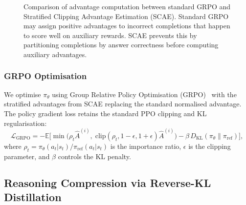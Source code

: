 \begin{figure}[t]
    \centering
    \caption{Comparison of advantage computation between standard GRPO
    and Stratified Clipping Advantage Estimation (SCAE). Standard GRPO
    may assign positive advantages to incorrect completions that happen
    to score well on auxiliary rewards. SCAE prevents this by
    partitioning completions by answer correctness before computing
    auxiliary advantages.}
    \label{fig:scae}
\end{figure}

\subsubsection{GRPO Optimisation}

We optimise $\pi_\theta$ using Group Relative Policy Optimisation
(GRPO)~\citep{shao2024deepseekmath} with the stratified advantages from
SCAE replacing the standard normalised advantage. The policy gradient loss
retains the standard PPO clipping and KL regularisation:
\begin{equation}
\label{eq:grpo_loss}
\mathcal{L}_{\mathrm{GRPO}} = -\mathbb{E}\bigg[
    \min\!\Big(\rho_t \hat{A}^{(i)},\;
    \mathrm{clip}(\rho_t, 1\!-\!\epsilon, 1\!+\!\epsilon)\hat{A}^{(i)}
    \Big) - \beta\, D_{\mathrm{KL}}(\pi_\theta \| \pi_{\mathrm{ref}})
\bigg],
\end{equation}
where $\rho_t = \pi_\theta(a_t | s_t) / \pi_{\mathrm{ref}}(a_t | s_t)$
is the importance ratio, $\epsilon$ is the clipping parameter, and $\beta$
controls the KL penalty.

\subsection{Reasoning Compression via Reverse-KL Distillation}
\label{sec:compression}

